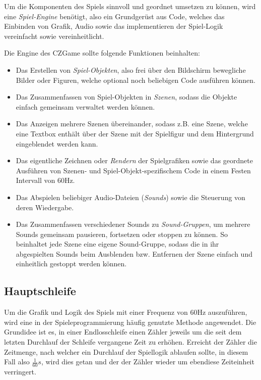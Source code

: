 Um die Komponenten des Spiels sinnvoll und geordnet umsetzen zu
können, wird eine \textit{Spiel-Engine} benötigt, also ein
Grundgerüst aus Code, welches das Einbinden von Grafik, Audio sowie
das implementieren der Spiel-Logik vereinfacht sowie vereinheitlicht.

Die Engine des CZGame sollte folgende Funktionen
beinhalten:

\begin{itemize}
	\item Das Erstellen von \textit{Spiel-Objekten}, also
	frei über den Bildschirm bewegliche Bilder oder Figuren,
	welche optional noch beliebigen Code ausführen können.
	\item Das Zusammenfassen von Spiel-Objekten in \textit{Szenen},
	sodass die Objekte einfach gemeinsam verwaltet werden können.
	\item Das Anzeigen mehrere Szenen übereinander, sodass z.B.
	eine Szene, welche eine Textbox enthält über der Szene mit
	der Spielfigur und dem Hintergrund eingeblendet werden kann.
	\item Das eigentliche \glqq{}Zeichnen\grqq{} oder \textit{Rendern} der Spielgrafiken
	sowie das geordnete Ausführen von Szenen- und Spiel-Objekt-spezifischem
	Code in einem Festen Intervall von 60Hz.
	\item Das Abspielen beliebiger Audio-Dateien (\textit{Sounds})
	sowie die Steuerung von deren Wiedergabe.
	\item Das Zusammenfassen verschiedener Sounds zu \textit{Sound-Gruppen},
	um mehrere Sounds gemeinsam pausieren, fortsetzen oder stoppen zu können.
	So beinhaltet jede Szene eine eigene Sound-Gruppe, sodass die in ihr
	abgespielten Sounds beim Ausblenden bzw. Entfernen der Szene einfach
	und einheitlich gestoppt werden können.
\end{itemize}


\subsection{Hauptschleife} \label{idee:engine:hauptschleife}

Um die Grafik und Logik des Spiels mit einer Frequenz von 60Hz
auszuführen, wird eine in der Spieleprogrammierung häufig
genutzte Methode angewendet. Die Grundidee ist es, in einer
Endlosschleife einen Zähler jeweils um die seit dem letzten
Durchlauf der Schleife vergangene Zeit zu erhöhen. Erreicht der
Zähler die Zeitmenge, nach welcher ein Durchlauf der Spiellogik
ablaufen sollte, in diesem Fall also $\frac{1}{60}s$, wird dies
getan und der der Zähler wieder um ebendiese Zeiteinheit verringert.

